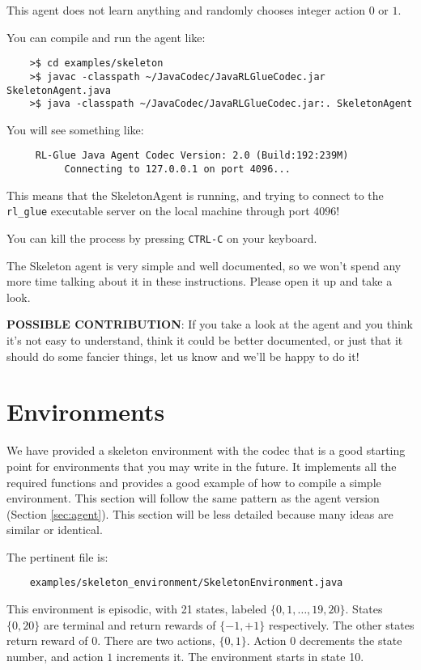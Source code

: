 \documentclass[11pt]{article}
\begin{document}
This agent does not learn anything and randomly chooses integer action $0$ or $1$.  

You can compile and run the agent like:
\begin{verbatim}
	>$ cd examples/skeleton
	>$ javac -classpath ~/JavaCodec/JavaRLGlueCodec.jar SkeletonAgent.java
	>$ java -classpath ~/JavaCodec/JavaRLGlueCodec.jar:. SkeletonAgent
\end{verbatim}

You will see something like:
\begin{verbatim}
     RL-Glue Java Agent Codec Version: 2.0 (Build:192:239M)
          Connecting to 127.0.0.1 on port 4096...
\end{verbatim}

This means that the SkeletonAgent is running, and trying to connect to the \texttt{rl\_glue} executable server on the local machine through port $4096$! 

You can kill the process by pressing \texttt{CTRL-C} on your keyboard.

The Skeleton agent is very simple and well documented, so we won't spend any more time talking about it in these instructions.
Please open it up and take a look.

\textbf{POSSIBLE CONTRIBUTION}: If you take a look at the agent and you think it's not easy to understand, think it could be better documented, 
or just that it should do some fancier things, let us know and we'll be happy to do it!



\section{Environments}
We have provided a skeleton environment with the codec that is a good starting point for environments that you may write in the future.
It implements all the required functions and provides a good example of how to compile a simple environment.  This section will follow the same 
pattern as the agent version (Section \ref{sec:agent}).  This section will be less detailed because many ideas are similar or identical.

The pertinent file is:
\begin{verbatim}
	examples/skeleton_environment/SkeletonEnvironment.java
\end{verbatim}

This environment is episodic, with 21 states, labeled $\{0, 1,\ldots,19,20\}$. States $\{0, 20\}$ are terminal and return rewards of $\{-1, +1\}$ respectively.  The other states return reward of $0$.
There are two actions, $\{0, 1\}$.  Action $0$ decrements the state number, and action $1$ increments it. The environment starts in state 10.
\end{document}
